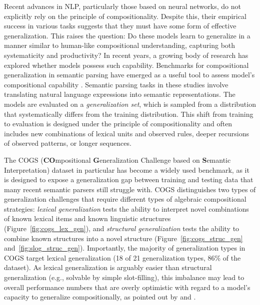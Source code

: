 Recent advances in NLP, particularly those based on neural networks, do not explicitly rely on the principle of compositionality. Despite this, their empirical success in various tasks suggests that they must have some form of effective generalization. This raises the question: Do these models learn to generalize in a manner similar to human-like compositional understanding, capturing both systematicity and productivity?
In recent years, a growing body of research has explored whether models possess such capability. Benchmarks for compositional generalization in semantic parsing have emerged as a useful tool to assess model's compositional capability \citep{lake2018generalization,hupkes2020compositionality,keysersmeasuring,kim-linzen-2020-cogs}. Semantic parsing tasks in these studies involve translating natural language expressions into semantic representations. The models are evaluated on a \emph{generalization set}, which is sampled from a distribution that systematically differs from the training distribution. This shift from training to evaluation is designed under the principle of compositionality and often includes new combinations of lexical units and observed rules, deeper recursions of observed patterns, or longer sequences. 



The COGS (\textbf{CO}mpositional \textbf{G}eneralization
Challenge based on \textbf{S}emantic Interpretation) dataset \citep{kim-linzen-2020-cogs} in particular has become a widely used benchmark, as it is designed to expose a generalization gap between training and testing data that many recent semantic parsers still struggle with. COGS distinguishes two types of generalization challenges that require different types of algebraic compositional strategies: \textit{lexical generalization} tests the ability to interpret novel combinations of known lexical items and known linguistic structures (Figure~\ref{fig:cogs_lex_gen}), and \textit{structural generalization} tests the ability to combine known structures into a novel structure (Figure~\ref{fig:cogs_struc_gen} and~\ref{fig:slog_struc_gen}). Importantly, the majority of generalization types in COGS target lexical generalization (18 of 21 generalization types, 86\% of the dataset). As lexical generalization is arguably easier than structural generalization (e.g., solvable by simple slot-filling), this imbalance may lead to overall performance numbers that are overly optimistic with regard to a model's capacity to generalize compositionally, as pointed out by \cite{weissenhorn-etal-2022-compositional} and \cite{yao-koller-2022-structural}. 




